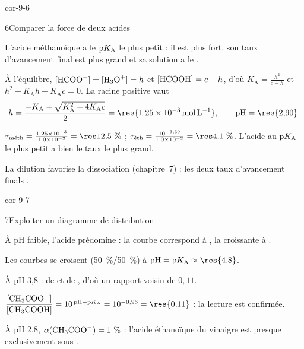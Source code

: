 \begin{blocLivre}{cor-9-6}
\begin{corrige}{6}{Comparer la force de deux acides}
\begin{questions}
\item L'acide méthanoïque a le $\mathrm{p}K_{\mathrm{A}}$ le plus petit : il est plus fort, son taux d'avancement final est plus grand et
sa solution a le .
\item À l'équilibre, $[\ce{HCOO-}]=[\ce{H3O+}]=h$ et $[\ce{HCOOH}]=c-h$, d'où $K_\mathrm{A}=\frac{h^2}{c-h}$ et
$h^2+K_\mathrm{A}h-K_\mathrm{A}c=0$. La racine positive vaut
\[h=\frac{-K_\mathrm{A}+\sqrt{K_\mathrm{A}^2+4K_\mathrm{A}c}}{2}=\res{\qty{1,25e-3}{mol.L^{-1}}},\qquad\pH=\res{2{,}90}.\]
\item $\tau_{\text{méth}}=\frac{\num{1.25e-3}}{\num{1.0e-2}}=\res{12{,}5~\%}$ ;
$\tau_{\text{éth}}=\frac{10^{-3{,}39}}{\num{1.0e-2}}=\res{4{,}1~\%}$. L'acide au $\mathrm{p}K_{\mathrm{A}}$ le plus petit a bien le taux le
plus grand.
\item La dilution favorise la dissociation (chapitre~7) : les deux taux d'avancement finals .
\end{questions}
\end{corrige}
\end{blocLivre}
\begin{blocLivre}{cor-9-7}
\begin{corrige}{7}{Exploiter un diagramme de distribution}
\begin{questions}
\item À pH faible, l'acide prédomine : la courbe  correspond à , la croissante à
.
\item Les courbes se croisent (50~\%/50~\%) à $\pH=\pKa\approx\res{4{,}8}$.
\item À pH 3,8 :  de  et  de , d'où un rapport voisin de $0{,}11$.
\item $\dfrac{[\ce{CH3COO-}]}{[\ce{CH3COOH}]}=10^{\,\pH-\pKa}=10^{-0{,}96}=\res{0{,}11}$ : la lecture est confirmée.
\item À pH 2,8, $\alpha(\ce{CH3COO-})=1~\%$ : l'acide éthanoïque du vinaigre est presque exclusivement sous
.
\end{questions}
\end{corrige}
\end{blocLivre}
